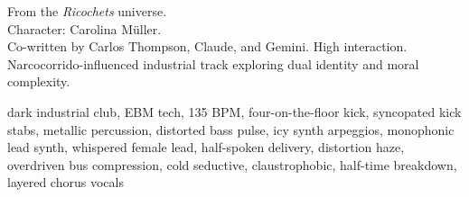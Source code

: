 

\begin{notes}
From the \emph{Ricochets} universe.\\
Character: Carolina Müller.\\
Co-written by Carlos Thompson, Claude, and Gemini. %
High interaction.\\
Narcocorrido-influenced industrial track exploring dual identity and moral complexity.
\end{notes}

\begin{style}
dark industrial club, EBM tech, 135 BPM, four-on-the-floor kick, syncopated kick stabs, metallic percussion, distorted bass pulse, icy synth arpeggios, monophonic lead synth, whispered female lead, half-spoken delivery, distortion haze, overdriven bus compression, cold seductive, claustrophobic, half-time breakdown, layered chorus vocals
\end{style}

